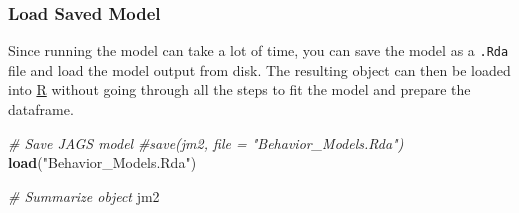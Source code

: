 \documentclass[]{article}
\newenvironment{Shaded}{\begin{snugshade}}{\end{snugshade}}
\newcommand{\CommentTok}[1]{\textcolor[rgb]{0.56,0.35,0.01}{\textit{#1}}}
\newcommand{\KeywordTok}[1]{\textcolor[rgb]{0.13,0.29,0.53}{\textbf{#1}}}
\newcommand{\NormalTok}[1]{#1}
\newcommand{\StringTok}[1]{\textcolor[rgb]{0.31,0.60,0.02}{#1}}
\begin{document}
\hypertarget{load-saved-model}{%
\subsubsection{Load Saved Model}\label{load-saved-model}}

Since running the model can take a lot of time, you can save the model
as a \texttt{.Rda} file and load the model output from disk. The
resulting object can then be loaded into
\href{https://cran.r-project.org/}{R} without going through all the
steps to fit the model and prepare the dataframe.

\begin{Shaded}
\begin{Highlighting}[]
\CommentTok{# Save JAGS model}
\CommentTok{#save(jm2, file = "Behavior_Models.Rda")}
\KeywordTok{load}\NormalTok{(}\StringTok{"Behavior_Models.Rda"}\NormalTok{)}

\CommentTok{# Summarize object}
\NormalTok{jm2}
\end{Highlighting}
\end{Shaded}
\end{document}
